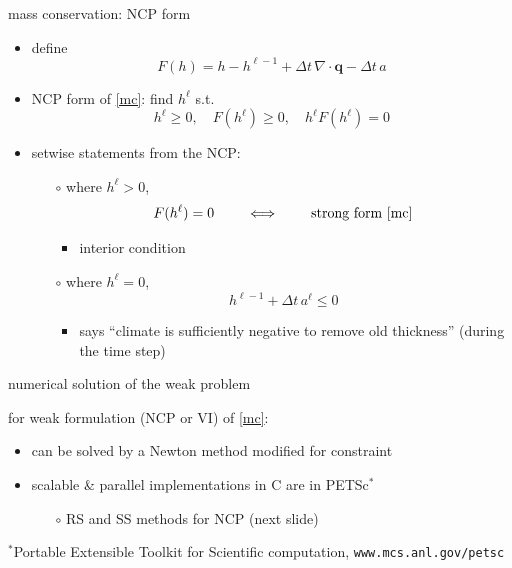 \documentclass[xcolor={dvipsnames}]{beamer}
\newcommand\bq{\mathbf{q}}
\newcommand\Div{\nabla\cdot}
\begin{document}
\begin{frame}{mass conservation: NCP form}

\begin{itemize}
\item define
    $$F(h) = h - h^{\ell-1} + \Delta t\, \Div \bq - \Delta t\, a$$
\item NCP form of \eqref{mc}: \quad find $h^\ell$ s.t.
   $$h^\ell \ge 0, \quad F(h^\ell) \ge 0, \quad h^\ell F(h^\ell) = 0$$
\item setwise statements from the NCP:
    \begin{itemize}
    \item[$\circ$] where $h^\ell > 0$,
        $$F(h^\ell) = 0 \qquad \iff \qquad \text{strong form \eqref{mc}}$$
        \vspace{-4mm}
        \begin{itemize}
        \item interior condition
        \end{itemize}
    \item[$\circ$] where $h^\ell = 0$,
        $$h^{\ell-1} + \Delta t\, a^\ell \le 0$$
        \vspace{-4mm}
        \begin{itemize}
        \item says ``climate is sufficiently negative to remove old thickness'' (during the time step)
        \end{itemize}
    \end{itemize}
\end{itemize}
\end{frame}


\begin{frame}{numerical solution of the weak problem}

for weak formulation (NCP or VI) of \eqref{mc}:
\begin{itemize}
\item can be solved by a Newton method modified for constraint
\item scalable \& parallel implementations in C are in PETSc$^*$
  \begin{itemize}
  \item[$\circ$]  RS and SS methods for NCP (next slide)
  \end{itemize}
\end{itemize}

\vspace{15mm}
{\scriptsize $^*$Portable Extensible Toolkit for Scientific computation, \texttt{www.mcs.anl.gov/petsc}}
\end{frame}
\end{document}
